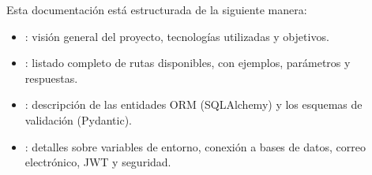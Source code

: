 \documentclass[a4paper,11pt,spanish]{sphinxmanual}
\begin{document}
\sphinxAtStartPar
Esta documentación está estructurada de la siguiente manera:
\begin{itemize}
\item {} 
\sphinxAtStartPar
{}: visión general del proyecto, tecnologías utilizadas y objetivos.

\item {} 
\sphinxAtStartPar
{}: listado completo de rutas disponibles, con ejemplos, parámetros y respuestas.

\item {} 
\sphinxAtStartPar
{}: descripción de las entidades ORM (SQLAlchemy) y los esquemas de validación (Pydantic).

\item {} 
\sphinxAtStartPar
{}: detalles sobre variables de entorno, conexión a bases de datos, correo electrónico, JWT y seguridad.

\end{itemize}
\end{document}
